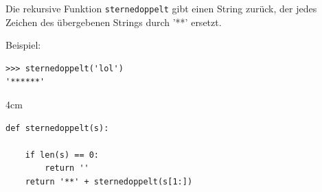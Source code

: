 \question[3]
Die rekursive Funktion \texttt{sternedoppelt}
gibt einen String zurück, der jedes Zeichen des übergebenen Strings
durch '**' ersetzt.

Beispiel:
\begin{lstlisting}
>>> sternedoppelt('lol')
'******'
\end{lstlisting}

\begin{solutionbox}{4cm}
\begin{lstlisting}
def sternedoppelt(s):

    if len(s) == 0:
        return ''
    return '**' + sternedoppelt(s[1:])
\end{lstlisting}
\end{solutionbox}
